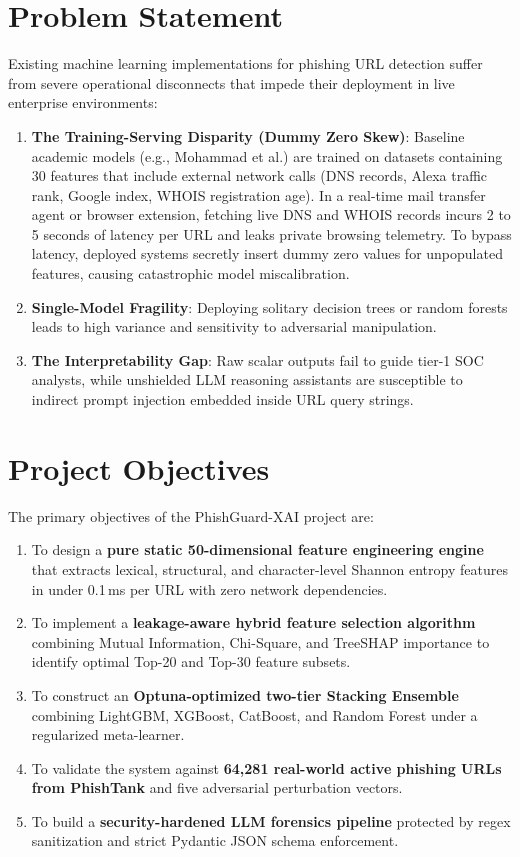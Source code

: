 \documentclass[12pt,a4paper,oneside]{report}
\begin{document}
\section{Problem Statement}
Existing machine learning implementations for phishing URL detection suffer from severe operational disconnects that impede their deployment in live enterprise environments:
\begin{enumerate}
    \item \textbf{The Training-Serving Disparity (Dummy Zero Skew)}: Baseline academic models (e.g., Mohammad et al.) are trained on datasets containing 30 features that include external network calls (DNS records, Alexa traffic rank, Google index, WHOIS registration age). In a real-time mail transfer agent or browser extension, fetching live DNS and WHOIS records incurs 2 to 5 seconds of latency per URL and leaks private browsing telemetry. To bypass latency, deployed systems secretly insert dummy zero values for unpopulated features, causing catastrophic model miscalibration.
    \item \textbf{Single-Model Fragility}: Deploying solitary decision trees or random forests leads to high variance and sensitivity to adversarial manipulation.
    \item \textbf{The Interpretability Gap}: Raw scalar outputs fail to guide tier-1 SOC analysts, while unshielded LLM reasoning assistants are susceptible to indirect prompt injection embedded inside URL query strings.
\end{enumerate}

\section{Project Objectives}
The primary objectives of the PhishGuard-XAI project are:
\begin{enumerate}
    \item To design a \textbf{pure static 50-dimensional feature engineering engine} that extracts lexical, structural, and character-level Shannon entropy features in under 0.1\,ms per URL with zero network dependencies.
    \item To implement a \textbf{leakage-aware hybrid feature selection algorithm} combining Mutual Information, Chi-Square, and TreeSHAP importance to identify optimal Top-20 and Top-30 feature subsets.
    \item To construct an \textbf{Optuna-optimized two-tier Stacking Ensemble} combining LightGBM, XGBoost, CatBoost, and Random Forest under a regularized meta-learner.
    \item To validate the system against \textbf{64,281 real-world active phishing URLs from PhishTank} and five adversarial perturbation vectors.
    \item To build a \textbf{security-hardened LLM forensics pipeline} protected by regex sanitization and strict Pydantic JSON schema enforcement.
\end{enumerate}
\end{document}
